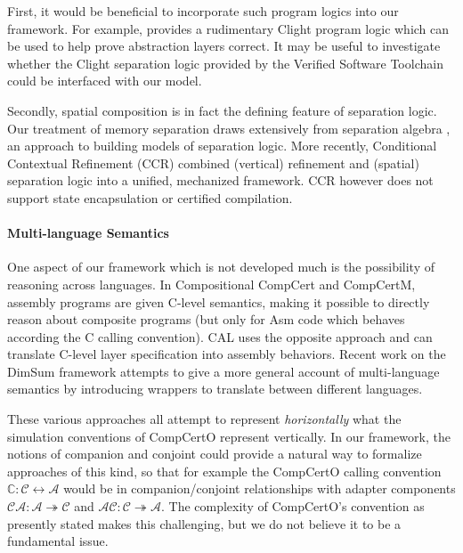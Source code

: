 \documentclass[acmsmall,screen,review,anonymous,nonacm]{acmart}
\begin{document}
First, it would be beneficial to incorporate
such program logics into our framework.
For example, \citet{popl15} provides
a rudimentary Clight program logic which
can be used to help prove abstraction layers correct. 
It may be useful to investigate whether
the Clight separation logic provided by
the Verified Software Toolchain \cite{vst}
could be interfaced with our model.

Secondly,
spatial composition is in fact
the defining feature of separation logic.
Our treatment of memory separation
draws extensively from
separation algebra \cite{sepalg},
an approach to building models of separation logic.
More recently,
Conditional Contextual Refinement (CCR) \cite{ccr}
combined (vertical) refinement and (spatial) separation logic into
a unified, mechanized framework.
CCR however does not support state encapsulation
or certified compilation.


\paragraph{Multi-language Semantics} %

One aspect of our framework which is not developed much
is the possibility of reasoning across languages.
In Compositional CompCert and CompCertM,
assembly programs are given C-level semantics,
making it possible to directly reason about composite programs
(but only for Asm code which behaves according the C calling convention).
CAL uses the opposite approach and can translate
C-level layer specification into assembly behaviors.
Recent work on the DimSum framework \cite{dimsum}
attempts to give a more general account of
multi-language semantics
by introducing wrappers to translate between
different languages.

These various approaches all attempt
to represent \emph{horizontally} what
the simulation conventions of CompCertO represent vertically.
In our framework,
the notions of companion and conjoint
could provide a natural way to formalize
approaches of this kind,
so that for example the CompCertO calling convention
$\mathbb{C} : \mathcal{C} \leftrightarrow \mathcal{A}$
would be in companion/conjoint relationships with
adapter components
$\mathcal{CA} : \mathcal{A} \twoheadrightarrow \mathcal{C}$
and
$\mathcal{AC} : \mathcal{C} \twoheadrightarrow \mathcal{A}$.
The complexity of CompCertO's convention as presently stated
makes this challenging,
but we do not believe it to be a fundamental issue.
\end{document}
